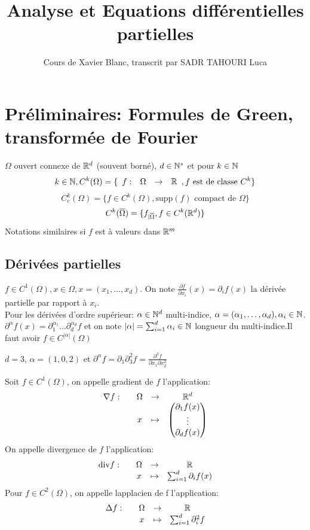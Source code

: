 \documentclass[]{report}
\title{Analyse et Equations différentielles partielles}
\author{Cours de Xavier Blanc, transcrit par SADR TAHOURI Luca}
\date{}
\begin{document}
    \maketitle
    \tableofcontents

    \chapter{Préliminaires: Formules de Green, transformée de Fourier}

    \begin{nt}{}{}
        $\Omega$ ouvert connexe de $\mathbb{R}^d$ (souvent borné), $d\in \mathbb{N}^*$ et pour $k\in \mathbb{N}$
        \[k\in \mathbb{N}, C^k(\Omega)=\{\begin{array}{ccccc} f : & \Omega & \to & \mathbb{R} \end{array},f\text{ est de classe } C^k\}\]
        \[C^k_c(\Omega)=\{f\in C^k(\Omega), \text{supp}(f)\text{ compact de }\Omega\}\]
        \[C^k(\overline{\Omega})=\{f_{|\overline{\Omega}},f\in C^k(\mathbb{R}^d)\}\]
        Notations similaires si $f$ est à valeurs dans $\mathbb{R}^m$
    \end{nt}

    \section{Dérivées partielles}

    $f\in C^1(\Omega),x\in \Omega,x=(x_1,\ldots,x_d)$. On note $\frac{\partial f}{\partial x_i}(x)=\partial_i f(x)$ la dérivée partielle par rapport à $x_i$.\\
    Pour les dérivées d'ordre supérieur: $\alpha\in \mathbb{N}^d$ multi-indice, $\alpha=(\alpha_1,\ldots,\alpha_d),\alpha_i\in \mathbb{N}$.\\
    $\partial^\alpha f(x)=\partial_1^{\alpha_1}\ldots \partial_d^{\alpha_d} f$ et on note $|\alpha|=\sum_{i=1}^{d}\alpha_i\in \mathbb{N}$ longueur du multi-indice.Il faut avoir $f\in C^{|\alpha|}(\Omega)$
    
    \begin{ex}{}{}
        $d=3$, $\alpha=(1,0,2)$ et $\partial^\alpha f=\partial_1\partial_3^2 f=\frac{\partial^3f}{\partial x_1\partial x_2^2}$
    \end{ex}

    \begin{df}{}{}
        Soit $f\in C^1(\Omega)$, on appelle gradient de $f$ l'application:
        \[\begin{array}{ccccc} \nabla f : & & \Omega & \to & \mathbb{R}^d \\ & & x & \mapsto & \left(\begin{matrix} \partial_1 f(x)\\ \vdots \\ \partial_d f(x) \end{matrix}\right) \end{array}\]
        On appelle divergence de $f$ l'application:
        \[\begin{array}{ccccc} \text{div} f : & & \Omega & \to & \mathbb{R} \\ & & x & \mapsto & \sum_{i=1}^d\partial_i f(x) \end{array}\]
        Pour $f\in C^2(\Omega)$, on appelle lapplacien de f l'application:
        \[\begin{array}{ccccc} \Delta f : & & \Omega & \to & \mathbb{R} \\ & & x & \mapsto & \sum_{i=1}^{d}\partial_i^2 f \end{array}\]
    \end{df}
\end{document}
